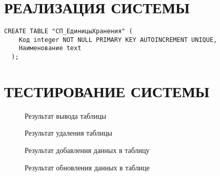 \documentclass[
  12pt, %
  a4paper, %
  simple, %
  floatsection %
]{eskdtext}
\begin{document}
  \newpage
  \section{РЕАЛИЗАЦИЯ СИСТЕМЫ}

  \begin{lstlisting}[name=Справочник "Единицы хранения"]
  CREATE TABLE "СП_ЕдиницыХранения" (
    Код integer NOT NULL PRIMARY KEY AUTOINCREMENT UNIQUE,
    Наименование text
  );
  \end{lstlisting}

  \newpage
  \section{ТЕСТИРОВАНИЕ СИСТЕМЫ}

  \begin{figure}[!h]
    \centering
    \caption{Результат вывода таблицы}
  \end{figure}

  \begin{figure}[!h]
    \centering
    \caption{Результат удаления таблицы}
  \end{figure}

  \begin{figure}[!h]
    \centering
    \caption{Результат добавления данных в таблицу}
  \end{figure}

  \begin{figure}[!h]
    \centering
    \caption{Результат обновления данных в таблице}
\end{figure}

  \newpage
\end{document}
